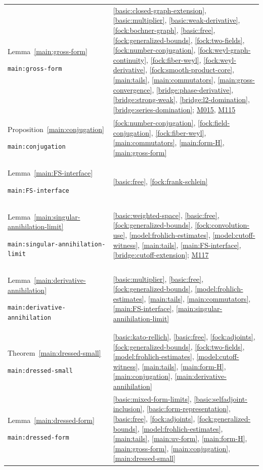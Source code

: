 \documentclass[11pt,a4paper]{article}
\theoremstyle{definition}
\theoremstyle{remark}
\begin{document}
\begin{longtable}{@{}p{}p{}@{}}
Lemma~\ref{main:gross-form}\par\nolinkurl{main:gross-form} & \ref{basic:closed-graph-extension}, \ref{basic:multiplier}, \ref{basic:weak-derivative}, \ref{fock:bochner-graph}, \ref{basic:free}, \ref{fock:generalized-bounds}, \ref{fock:two-fields}, \ref{fock:number-conjugation}, \ref{fock:weyl-graph-continuity}, \ref{fock:fiber-weyl}, \ref{fock:weyl-derivative}, \ref{fock:smooth-product-core}, \ref{main:tails}, \ref{main:commutators}, \ref{main:gross-convergence}, \ref{bridge:phase-derivative}, \ref{bridge:strong-weak}, \ref{bridge:l2-domination}, \ref{bridge:series-domination}; \hyperref[base:M015]{M015}, \hyperref[base:M115]{M115} \\[4pt]
Proposition~\ref{main:conjugation}\par\nolinkurl{main:conjugation} & \ref{fock:number-conjugation}, \ref{fock:field-conjugation}, \ref{fock:fiber-weyl}, \ref{main:commutators}, \ref{main:form-H}, \ref{main:gross-form} \\[4pt]
Lemma~\ref{main:FS-interface}\par\nolinkurl{main:FS-interface} & \ref{basic:free}, \ref{fock:frank-schlein} \\[4pt]
Lemma~\ref{main:singular-annihilation-limit}\par\nolinkurl{main:singular-annihilation-limit} & \ref{basic:weighted-space}, \ref{basic:free}, \ref{fock:generalized-bounds}, \ref{fock:convolution-use}, \ref{model:frohlich-estimates}, \ref{model:cutoff-witness}, \ref{main:tails}, \ref{main:FS-interface}, \ref{bridge:cutoff-extension}; \hyperref[base:M117]{M117} \\[4pt]
Lemma~\ref{main:derivative-annihilation}\par\nolinkurl{main:derivative-annihilation} & \ref{basic:multiplier}, \ref{basic:free}, \ref{fock:generalized-bounds}, \ref{model:frohlich-estimates}, \ref{main:tails}, \ref{main:commutators}, \ref{main:FS-interface}, \ref{main:singular-annihilation-limit} \\[4pt]
Theorem~\ref{main:dressed-small}\par\nolinkurl{main:dressed-small} & \ref{basic:kato-rellich}, \ref{basic:free}, \ref{fock:adjoints}, \ref{fock:generalized-bounds}, \ref{fock:two-fields}, \ref{model:frohlich-estimates}, \ref{model:cutoff-witness}, \ref{main:tails}, \ref{main:form-H}, \ref{main:conjugation}, \ref{main:derivative-annihilation} \\[4pt]
Lemma~\ref{main:dressed-form}\par\nolinkurl{main:dressed-form} & \ref{basic:mixed-form-limits}, \ref{basic:selfadjoint-inclusion}, \ref{basic:form-representation}, \ref{basic:free}, \ref{fock:adjoints}, \ref{fock:generalized-bounds}, \ref{model:frohlich-estimates}, \ref{main:tails}, \ref{main:uv-form}, \ref{main:form-H}, \ref{main:gross-form}, \ref{main:conjugation}, \ref{main:dressed-small} \\[4pt]

\end{longtable}
\end{document}
